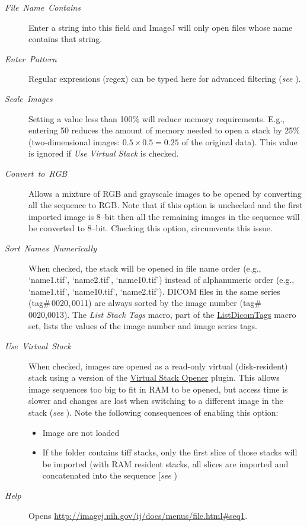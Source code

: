 \begin{description}
\item [{\emph{File\ Name\ Contains}}] Enter a string into this field
and ImageJ will only open files whose name contains that string.
\item [{\emph{Enter\ Pattern}}] Regular expressions (regex)
can be typed here for advanced filtering (\emph{see} ).
\item [{\emph{Scale\ Images}}] Setting a value less than 100\% will reduce
memory requirements. E.g., entering 50 reduces the amount of memory
needed to open a stack by 25\% (two-dimensional images: $0.5\times0.5=0.25$
of the original data). This value  is ignored if \emph{Use Virtual
Stack} is checked.
\item [{\emph{Convert\ to\ RGB}}] Allows a mixture of RGB and grayscale
images to be opened by converting all the sequence to RGB. Note that
if this option is unchecked and the first imported image is 8--bit
then all the remaining images in the sequence will be converted to
8--bit. Checking this option, circumvents this issue.
\item [{\emph{Sort\ Names\ Numerically}}] \improvement{}When checked,
the stack will be opened in  file name order (e.g.,
`name1.tif', `name2.tif', `name10.tif') instead of alphanumeric
order (e.g., `name1.tif', `name10.tif', `name2.tif'). DICOM
files in the same series (tag\#\,0020,\,0011) are always sorted
by the image number (tag\#\,0020,0013). The \emph{List Stack Tags}
macro, part of the \href{http://imagej.nih.gov/ij/macros/ListDicomTags.txt}{ListDicomTags}
macro set, lists the values of the image number and image series tags.
\item [{\emph{Use\ Virtual\ Stack}}] When checked, images are opened
as a read-only virtual (disk-resident) stack using a version of the
\href{http://imagej.nih.gov/ij/plugins/virtual-opener.html}{Virtual Stack Opener}
plugin. This allows image sequences too big to fit in RAM
to be opened, but access time is slower and changes are lost when
switching to a different image in the stack (\emph{see} ).
Note the following consequences of enabling this option:

\begin{itemize}
\item {}Image  are not loaded
\item If the folder contains tiff stacks, only the first slice of those
stacks will be imported (with RAM resident stacks, all slices are
imported and concatenated into the sequence {[}\emph{see} \userinterface{Image\lyxarrow{}Stacks\lyxarrow{}Tools\lyxarrow{}\nameref{sub:Concatenate...}}{]}
)
\end{itemize}
\item [{\emph{Help}}] Opens \href{http://imagej.nih.gov/ij/docs/menus/file.html\#seq1}{http://imagej.nih.gov/ij/docs/menus/file.html\#{}seq1}.
\end{description}


